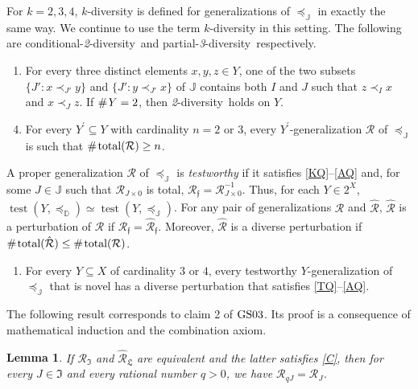 \documentclass[ecta,nameyear,draft]{econsocart}
\newcommand{\test}{\operatorname{test}}
\newcommand{\countof}{\mathbin{\#}\hskip1pt}
\newcommand{\mc}{\mathcal}
\newcommand{\novel}{\mathfrak f}
\newcommand{\preceqb}{\mathbin{\preceq}}
\newcommand{\ext}{\mathrel{\mc R}}
\newcommand{\extb}{\mathbin{\mc R}}
\newcommand{\hext}{\mathrel{\hat{\mathrel{\mathcal R}}}}
\newcommand{\hextb}{\mathbin{\hat{\mathbin{\mathcal R}}}}
\newcommand{\total}{\textup{total}}
\newcommand{\mbbd}{{\mathds D}}
\newcommand{\mbbipp}{{\mathfrak L}}
\newcommand{\mbbj}{\mathds J}
\newcommand{\mbbjpp}{\mathfrak{I}}
\newcommand{\parthreediv}{\textup{partial-\textit{3}-diversity}}
\newcommand{\condtwodiv}{\textup{conditional-\textit{2}-diversity}}
\newcommand{\twodiv}{\textit{2}-\textup{diversity}}
\newcommand{\gsii}{$\textup{GS03}$}
\theoremstyle{plain}
\newtheorem{lemma}{Lemma}[theorem]
\theoremstyle{remark}
\begin{document}
\begin{appendix}
  For $k = 2, 3, 4$, $k$-diversity is defined for {generalization}s of
  $\preceq_{\mbbj}$ in exactly the same way. We continue to use the term
  $k$-diversity in this setting.  The following are \condtwodiv\ and
  \parthreediv\ respectively.
  \begin{enumerate}[label=\textup{A\arabic*}$^ \flat$,resume]
    \item\label{c2dQ} For every three distinct elements $x , y , z \in Y$, one
      of the two subsets $\{J': x \prec_{J'} y \}$ and $\{J': y \prec_{J'} x\}$
      of $\mbbj$ contains both $I$ and $J$ such that $z \prec _{I} x$ and $x
      \prec _{J} z$. If $\countof Y = 2$, then \twodiv\ holds on $Y$.
  \end{enumerate}
  \begin{enumerate}[label=\textup{A\arabic*}$^{'\flat}$,resume]
    \setcounter{enumi}{3}
    \item\label{p3dQ} For every $Y^{\prime} \subseteq Y$ with cardinality $n =
      2$ or $3$, every $Y^{\prime}$-{generalization} $\ext$ of $\preceq
      _{\mbbj}$ is such that $\countof{\total(\ext)} \geq n$.
  \end{enumerate}

  A proper {generalization} $\ext$ of $\preceqb _{\mbbj}$ is \emph{testworthy}
  if it satisfies \ref{KQ}--\ref{AQ} and, for some $J\in \mbbj$ such that
  $\ext_{J\times 0}$ is total, $\extb_{\novel} = \extb_{J\times 0}^{-1}$. Thus,
  for each $Y \in 2^{X}$, $\test ( Y , \preceqb _{\mbbd} ) \simeq \test ( Y ,
  \preceqb _{\mbbj })$. For any pair of {generalization}s $\ext$ and $\hext$,
  $\hext$ is a perturbation of $\ext$ if $\extb_{\novel} = \hextb_{\novel}$.
  Moreover, $\hext$ is a {{diverse}} perturbation if $\countof \total (\hext)
  \leq \countof \total (\ext)$.
  \begin{enumerate}[label=\textit{4}-\textup{P}$^{\flat}$]
    \item\label{PQ} For every $Y \subseteq X$ of cardinality $3$ or $4$, every
      testworthy $Y$-{generalization} of $\preceqb _{\mbbj}$ that is novel has
      a {{diverse}} perturbation that satisfies \ref{TQ}–\ref{AQ}.
  \end{enumerate}

  The following result corresponds to claim 2 of \gsii. Its proof is a
  consequence of mathematical induction and the combination axiom.
  \vskip-15pt
  \begin{lemma}\label{lem-coneQ} If $\ext _ \mbbjpp$ and $\hext _ \mbbipp$ are
    equivalent and the latter satisfies \ref{C}, then for every $J \in \mbbjpp$
    and every rational number $q >0$, we have $\extb _{q J}  =  \extb _{J}$.
  \end{lemma}


\end{appendix}
\end{document}
